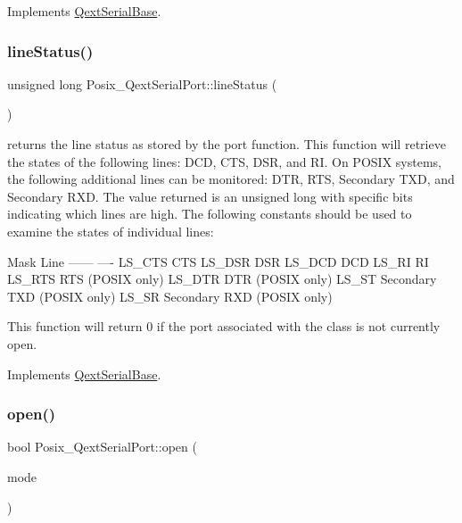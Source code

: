 Implements \mbox{\hyperlink{class_qext_serial_base}{Qext\+Serial\+Base}}.

\mbox{\label{class_posix___qext_serial_port_ab419544e866cab58b8a3ce6341f6a7e9}} 
\subsubsection{\texorpdfstring{line\+Status()}{lineStatus()}}
{\footnotesize\ttfamily unsigned long Posix\+\_\+\+Qext\+Serial\+Port\+::line\+Status (\begin{DoxyParamCaption}\item[{void}]{ }\end{DoxyParamCaption})\hspace{0.3cm}{\ttfamily [virtual]}}

returns the line status as stored by the port function. This function will retrieve the states of the following lines\+: D\+CD, C\+TS, D\+SR, and RI. On P\+O\+S\+IX systems, the following additional lines can be monitored\+: D\+TR, R\+TS, Secondary T\+XD, and Secondary R\+XD. The value returned is an unsigned long with specific bits indicating which lines are high. The following constants should be used to examine the states of individual lines\+:

\begin{DoxyVerb}Mask        Line
------      ----
LS_CTS      CTS
LS_DSR      DSR
LS_DCD      DCD
LS_RI       RI
LS_RTS      RTS (POSIX only)
LS_DTR      DTR (POSIX only)
LS_ST       Secondary TXD (POSIX only)
LS_SR       Secondary RXD (POSIX only)
\end{DoxyVerb}


This function will return 0 if the port associated with the class is not currently open. 

Implements \mbox{\hyperlink{class_qext_serial_base}{Qext\+Serial\+Base}}.

\mbox{\label{class_posix___qext_serial_port_a200cb519edfef82199bf1701f4b872e9}} 
\subsubsection{\texorpdfstring{open()}{open()}}
{\footnotesize\ttfamily bool Posix\+\_\+\+Qext\+Serial\+Port\+::open (\begin{DoxyParamCaption}\item[{Open\+Mode}]{mode }\end{DoxyParamCaption})\hspace{0.3cm}{\ttfamily [virtual]}}


